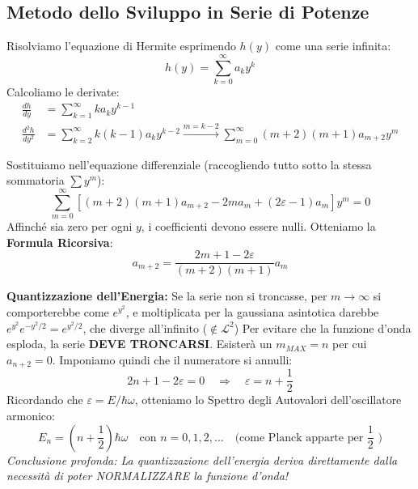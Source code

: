 \documentclass[11pt, a4paper]{article}
\begin{document}
\subsection{Metodo dello Sviluppo in Serie di Potenze} %

Risolviamo l'equazione di Hermite esprimendo $h(y)$ come una serie infinita: %
\begin{equation*}
    h(y) = \sum_{k=0}^\infty a_k y^k %
\end{equation*}
Calcoliamo le derivate: %
\begin{align*}
    \frac{dh}{dy} &= \sum_{k=1}^\infty k a_k y^{k-1} \\ %
    \frac{d^2 h}{dy^2} &= \sum_{k=2}^\infty k(k-1) a_k y^{k-2} \xrightarrow{m=k-2} \sum_{m=0}^\infty (m+2)(m+1) a_{m+2} y^m %
\end{align*}

Sostituiamo nell'equazione differenziale (raccogliendo tutto sotto la stessa sommatoria $\sum y^m$): %
\begin{equation*}
    \sum_{m=0}^\infty \left[ (m+2)(m+1)a_{m+2} - 2m a_m + (2\varepsilon - 1)a_m \right] y^m = 0 %
\end{equation*}
Affinché sia zero per ogni $y$, i coefficienti devono essere nulli. Otteniamo la \textbf{Formula Ricorsiva}: %
\begin{equation}
    \boxed{ a_{m+2} = \frac{2m + 1 - 2\varepsilon}{(m+2)(m+1)} a_m } %
\end{equation}

\noindent
\textbf{Quantizzazione dell'Energia:} %
Se la serie non si troncasse, per $m \to \infty$ si comporterebbe come $e^{y^2}$, e moltiplicata per la gaussiana asintotica darebbe $e^{y^2} e^{-y^2/2} = e^{y^2/2}$, che diverge all'infinito ($\notin \mathcal{L}^2$) %
Per evitare che la funzione d'onda esploda, la serie \textbf{DEVE TRONCARSI}. Esisterà un $m_{MAX} = n$ per cui $a_{n+2} = 0$. Imponiamo quindi che il numeratore si annulli: %
\begin{equation*}
    2n + 1 - 2\varepsilon = 0 \quad \Rightarrow \quad \varepsilon = n + \frac{1}{2} %
\end{equation*}
Ricordando che $\varepsilon = E / \hbar\omega$, otteniamo lo Spettro degli Autovalori dell'oscillatore armonico: %
\begin{equation}
    \boxed{ E_n = \left(n + \frac{1}{2}\right) \hbar\omega } \quad \text{con } n = 0, 1, 2, \dots \quad \text{(come Planck apparte per $\frac{1}{2}$ )} %
\end{equation}
\textit{Conclusione profonda: La quantizzazione dell'energia deriva direttamente dalla necessità di poter NORMALIZZARE la funzione d'onda!} %
\end{document}
